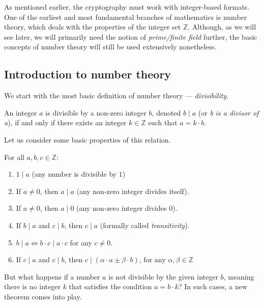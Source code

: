 \documentclass[../lecture-notes-148x210.tex]{subfiles}
\begin{document}
    
As mentioned earlier, the cryptography must work with integer-based formats. 
One of the earliest and most fundamental branches of mathematics is number theory, which 
deals with the properties of the integer set $\mathbb{Z}$. Although, as we will see later, 
we will primarily need the notion of \emph{prime/finite field} further, the basic concepts 
of number theory will still be used extensively nonetheless.

\subsection{Introduction to number theory}

We start with the most basic definition of number theory --- \emph{divisibility}.

\begin{definition}
    An integer $a$ is divisible by a non-zero integer $b$, denoted $b \mid a$ (or \emph{b is a divisor of a}), if and only if there exists an integer $k \in \mathbb{Z}$ such that $a = k \cdot b$.
\end{definition}

Let us consider some basic properties of this relation.

\begin{lemma}
    For all $a, b, c \in \mathbb{Z}:$
    \hfill
    \begin{enumerate}
        \item $1 \mid a$ (any number is divisible by $1$)
        \item If $a \neq 0$, then $a \mid a$ (any non-zero integer divides itself).
        \item If $a \neq 0$, then $a \mid 0$ (any non-zero integer divides $0$).
        \item If $b \mid a$ and $c \mid b$, then $c \mid a$ (formally called \emph{transitivity}).
        \item $b \mid a \iff b \cdot c \mid a \cdot c$ for any $c \neq 0$.
        \item If $c \mid a$ and $c \mid b$, then $c \mid (\alpha \cdot a \pm \beta \cdot b)$, $\text{for any } \alpha, \beta \in \mathbb{Z}$
    \end{enumerate}
\end{lemma}

But what happens if a number $a$ is not divisible by the given integer $b$, meaning there is no integer $k$ that satisfies the condition $a = b \cdot k$? In such cases, a new theorem comes into play.
\end{document}
